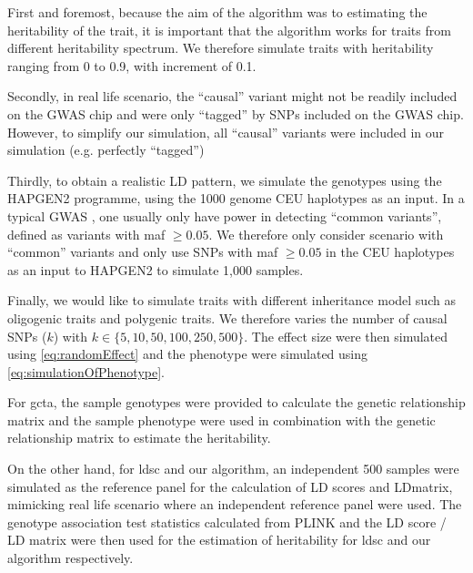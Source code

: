 			First and foremost, because the aim of the algorithm was to estimating the heritability of the trait, it is important that the algorithm works for traits from different heritability spectrum.
			We therefore simulate traits with heritability ranging from 0 to 0.9, with increment of 0.1.
		
			Secondly, in real life scenario, the ``causal'' variant might not be readily included on the \gls{GWAS} chip and were only ``tagged'' by \glspl{SNP} included on the \gls{GWAS} chip.
			However, to simplify our simulation, all ``causal'' variants were included in our simulation (e.g. perfectly ``tagged'')
		
			Thirdly, to obtain a realistic \gls{LD} pattern, we simulate the genotypes using the HAPGEN2 programme\citep{Su2011}, using the 1000 genome \gls{CEU} haplotypes as an input.
			In a typical \gls{GWAS} , one usually only have power in detecting ``common variants'', defined as variants with \gls{maf} $\ge 0.05$.
			We therefore only consider scenario with ``common'' variants and only use \glspl{SNP} with \gls{maf} $\ge0.05$ in the \gls{CEU} haplotypes as an input to HAPGEN2 to simulate 1,000 samples.
			
			Finally, we would like to simulate traits with different inheritance model such as oligogenic traits and polygenic traits.
			We therefore varies the number of causal \glspl{SNP} ($k$) with $k\in\{5, 10, 50, 100, 250, 500\}$.
			The effect size were then simulated using \cref{eq:randomEffect} and the phenotype were simulated using \cref{eq:simulationOfPhenotype}.
			
			For \gls{gcta}, the sample genotypes were provided to calculate the genetic relationship matrix and the sample phenotype were used in combination with the genetic relationship matrix to estimate the heritability.
			
			On the other hand, for \gls{ldsc} and our algorithm, an independent 500 samples were simulated as the reference panel for the calculation of \gls{LD} scores and \gls{LD}matrix, mimicking real life scenario where an independent reference panel were used. 
			The genotype association test statistics calculated from PLINK and the \gls{LD} score / \gls{LD} matrix were then used for the estimation of heritability for \gls{ldsc} and our algorithm respectively. 
			
